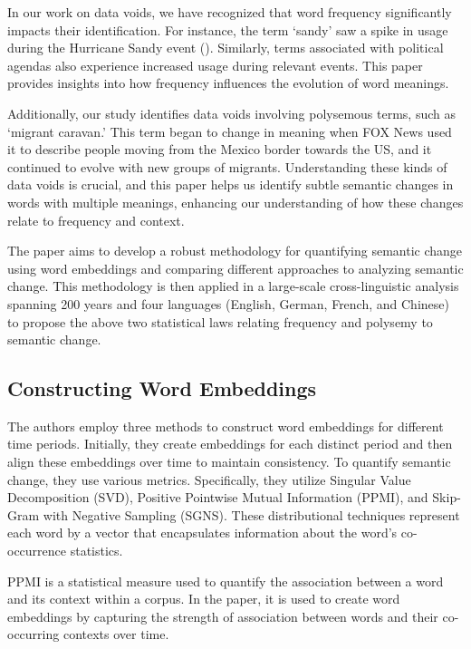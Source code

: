 In our work on data voids, we have recognized that word frequency significantly impacts their identification.
For instance, the term `sandy' saw a spike in usage during the Hurricane Sandy event ().
Similarly, terms associated with political agendas also experience increased usage during relevant events.
This paper provides insights into how frequency influences the evolution of word meanings.

Additionally, our study identifies data voids involving polysemous terms, such as `migrant caravan.'
This term began to change in meaning when FOX News used it to describe people moving from the Mexico border towards the US, and it continued to evolve with new groups of migrants.
Understanding these kinds of data voids is crucial, and this paper helps us identify subtle semantic changes in words with multiple meanings,
enhancing our understanding of how these changes relate to frequency and context.

The paper aims to develop a robust methodology for quantifying semantic change using word embeddings and comparing different approaches to analyzing semantic change.
This methodology is then applied in a large-scale cross-linguistic analysis spanning 200 years and four languages
(English, German, French, and Chinese) to propose the above two statistical laws relating frequency and polysemy to semantic change.

\subsection{Constructing Word Embeddings}\label{subsec:constructing-word-embeddings}
The authors employ three methods to construct word embeddings for different time periods.
Initially, they create embeddings for each distinct period and then align these embeddings over time to maintain consistency.
To quantify semantic change, they use various metrics.
Specifically, they utilize Singular Value Decomposition (SVD), Positive Pointwise Mutual Information (PPMI), and Skip-Gram with Negative Sampling (SGNS).
These distributional techniques represent each word by a vector that encapsulates information about the word’s co-occurrence statistics.

PPMI is a statistical measure used to quantify the association between a word and its context within a corpus.
In the paper, it is used to create word embeddings by capturing the strength of association between words and their co-occurring contexts over time.

